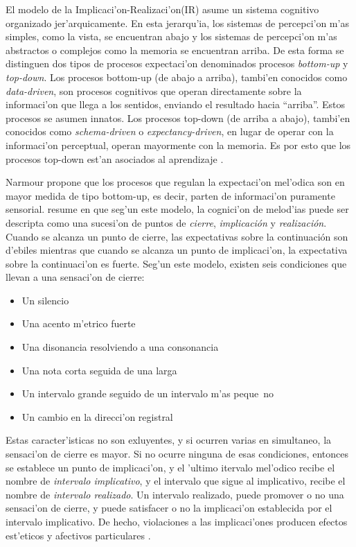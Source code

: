 \begin{imagen}
    \width{11cm}
\end{imagen}


El modelo de la Implicaci'on-Realizaci'on(IR) asume un sistema cognitivo organizado jer'arquicamente. En esta jerarqu'ia, los sistemas 
de percepci'on m'as simples, como la vista, se encuentran abajo y los sistemas de percepci'on m'as abstractos o complejos como la memoria
se encuentran arriba. De esta forma se distinguen dos tipos de procesos expectaci'on denominados procesos \emph{bottom-up} 
y \emph{top-down}. Los procesos bottom-up (de abajo a arriba), tambi'en conocidos como \emph{data-driven}, son procesos cognitivos que 
operan directamente sobre la informaci'on que llega a los sentidos, enviando el resultado hacia ``arriba''. 
Estos procesos se asumen innatos.  Los procesos top-down (de arriba a abajo), tambi'en conocidos como \emph{schema-driven} o 
\emph{expectancy-driven}, en lugar de operar con la informaci'on perceptual, operan mayormente con la memoria. Es por esto que los 
procesos top-down est'an asociados al aprendizaje \cite[p. 256, p. 264]{snyder2001}.

Narmour propone que los procesos que regulan la expectaci'on mel'odica son en mayor medida de tipo bottom-up, es decir, parten de informaci'on puramente sensorial. 
\cite{Krumhansl95} resume en  que seg'un este modelo, la cognici'on de melod'ias puede ser descripta como una sucesi'on de puntos 
de \emph{cierre}, \emph{implicaci\'on} y \emph{realizaci\'on}. Cuando se alcanza un punto de cierre, las expectativas sobre la continuaci\'on 
son d'ebiles mientras que cuando se alcanza un punto de implicaci'on, la expectativa sobre la continuaci'on es fuerte. Seg'un este modelo,
existen seis condiciones que llevan a una sensaci'on de cierre:
\begin{itemize}
 \item Un silencio
 \item Una acento m'etrico fuerte
 \item Una disonancia resolviendo a una consonancia
 \item Una nota corta seguida de una larga
 \item Un intervalo grande seguido de un intervalo m'as peque~no
 \item Un cambio en la direcci'on registral
\end{itemize}

Estas caracter'isticas no son exluyentes, y si ocurren varias en simultaneo, la sensaci'on de cierre es mayor. 
Si no ocurre ninguna de esas condiciones, entonces se establece un punto de implicaci'on, y el 'ultimo itervalo mel'odico recibe el nombre
de \emph{intervalo implicativo}, y el intervalo que sigue al implicativo, recibe el nombre de \emph{intervalo realizado}. 
Un intervalo realizado, puede promover o no una sensaci'on de cierre, y puede satisfacer o no la implicaci'on establecida por el intervalo 
implicativo. De hecho, violaciones a las implicaci'ones producen efectos est'eticos y afectivos particulares \citep{Narmour90}.
 
